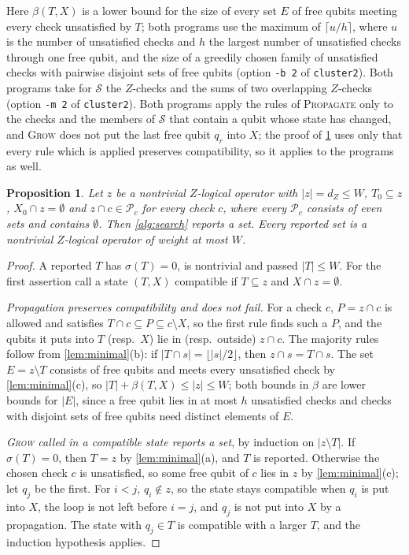 \documentclass[11pt]{amsart}
\newtheorem{proposition}[theorem]{Proposition}
\theoremstyle{definition}
\theoremstyle{remark}
\begin{document}
Here $\beta(T,X)$ is a lower bound for the size of every set $E$ of free qubits meeting every check unsatisfied by $T$; both programs use the maximum of $\lceil u/h\rceil$, where $u$ is the number of unsatisfied checks and $h$ the largest number of unsatisfied checks through one free qubit, and the size of a greedily chosen family of unsatisfied checks with pairwise disjoint sets of free qubits (option \texttt{-b 2} of \texttt{cluster2}). Both programs take for $\mathcal S$ the $Z$-checks and the sums of two overlapping $Z$-checks (option \texttt{-m 2} of \texttt{cluster2}). Both programs apply the rules of \textsc{Propagate} only to the checks and the members of $\mathcal S$ that contain a qubit whose state has changed, and \textsc{Grow} does not put the last free qubit $q_r$ into $X$; the proof of \cref{prop:exact} uses only that every rule which is applied preserves compatibility, so it applies to the programs as well.

\begin{proposition}\label{prop:exact}
Let $z$ be a nontrivial $Z$-logical operator with $|z|=d_Z\le W$, $T_0\subseteq z$, $X_0\cap z=\emptyset$ and $z\cap c\in\mathcal P_c$ for every check $c$, where every $\mathcal P_c$ consists of even sets and contains $\emptyset$. Then \cref{alg:search} reports a set. Every reported set is a nontrivial $Z$-logical operator of weight at most $W$.
\end{proposition}

\begin{proof}
A reported $T$ has $\sigma(T)=0$, is nontrivial and passed $|T|\le W$. For the first assertion call a state $(T,X)$ compatible if $T\subseteq z$ and $X\cap z=\emptyset$.

\emph{Propagation preserves compatibility and does not fail.} For a check $c$, $P=z\cap c$ is allowed and satisfies $T\cap c\subseteq P\subseteq c\setminus X$, so the first rule finds such a $P$, and the qubits it puts into $T$ (resp.\ $X$) lie in (resp.\ outside) $z\cap c$. The majority rules follow from \cref{lem:minimal}(b): if $|T\cap s|=\lfloor|s|/2\rfloor$, then $z\cap s=T\cap s$. The set $E=z\setminus T$ consists of free qubits and meets every unsatisfied check by \cref{lem:minimal}(c), so $|T|+\beta(T,X)\le|z|\le W$; both bounds in $\beta$ are lower bounds for $|E|$, since a free qubit lies in at most $h$ unsatisfied checks and checks with disjoint sets of free qubits need distinct elements of $E$.

\emph{\textsc{Grow} called in a compatible state reports a set}, by induction on $|z\setminus T|$. If $\sigma(T)=0$, then $T=z$ by \cref{lem:minimal}(a), and $T$ is reported. Otherwise the chosen check $c$ is unsatisfied, so some free qubit of $c$ lies in $z$ by \cref{lem:minimal}(c); let $q_j$ be the first. For $i<j$, $q_i\notin z$, so the state stays compatible when $q_i$ is put into $X$, the loop is not left before $i=j$, and $q_j$ is not put into $X$ by a propagation. The state with $q_j\in T$ is compatible with a larger $T$, and the induction hypothesis applies.
\end{proof}
\end{document}
